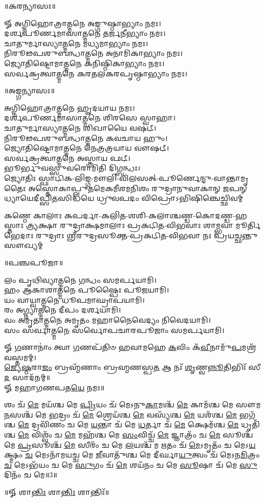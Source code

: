 \centerline{॥𑌕𑌰𑌨𑍍𑌯𑌾𑌸𑌃॥}
𑍐 𑌅𑌗𑍍𑌨𑌿𑌹𑍋𑌤𑍍𑌰𑌾𑌤𑍍𑌮𑌨𑍇 𑌅𑌙𑍍𑌗𑍁𑌷𑍍𑌠𑌾𑌭𑍍𑌯𑌾𑌂 𑌨𑌮𑌃।\\
𑌦𑌰𑍍𑌶𑌪𑍂𑌰𑍍𑌣𑌮𑌾𑌸𑌾𑌤𑍍𑌮𑌨𑍇 𑌤𑌰𑍍𑌜𑌨𑍀𑌭𑍍𑌯𑌾𑌂 𑌨𑌮𑌃।\\
𑌚𑌾𑌤𑍁𑌰𑍍𑌮𑌾𑌸𑍍𑌯𑌾𑌤𑍍𑌮𑌨𑍇 𑌮𑌧𑍍𑌯𑌮𑌾𑌭𑍍𑌯𑌾𑌂 𑌨𑌮𑌃।\\
𑌨𑌿𑌰𑍂𑌢𑌪𑌶𑍁𑌬𑌨𑍍𑌧𑌾𑌤𑍍𑌮𑌨𑍇 𑌅𑌨𑌾𑌮𑌿𑌕𑌾𑌭𑍍𑌯𑌾𑌂 𑌨𑌮𑌃।\\
𑌜𑍍𑌯𑍋𑌤𑌿𑌷𑍍𑌟𑍋𑌮𑌾𑌤𑍍𑌮𑌨𑍇 𑌕𑌨𑌿𑌷𑍍𑌠𑌿𑌕𑌾𑌭𑍍𑌯𑌾𑌂 𑌨𑌮𑌃।\\
𑌸𑌰𑍍𑌵𑌕𑍍𑌰𑌤𑍍𑌵𑌾𑌤𑍍𑌮𑌨𑍇 𑌕𑌰𑌤𑌲𑌕𑌰𑌪𑍃𑌷𑍍𑌠𑌾𑌭𑍍𑌯𑌾𑌂  𑌨𑌮𑌃।\\


\centerline{॥𑌅𑌙𑍍𑌗𑌨𑍍𑌯𑌾𑌸𑌃॥}
𑌅𑌗𑍍𑌨𑌿𑌹𑍋𑌤𑍍𑌰𑌾𑌤𑍍𑌮𑌨𑍇 𑌹𑍄𑌦𑌯𑌾𑌯 𑌨𑌮𑌃।\\
𑌦𑌰𑍍𑌶𑌪𑍂𑌰𑍍𑌣𑌮𑌾𑌸𑌾𑌤𑍍𑌮𑌨𑍇 𑌶𑌿𑌰𑌸𑍇 𑌸𑍍𑌵𑌾𑌹𑌾।\\
𑌚𑌾𑌤𑍁𑌰𑍍𑌮𑌾𑌸𑍍𑌯𑌾𑌤𑍍𑌮𑌨𑍇 𑌶𑌿𑌖𑌾𑌯𑍈 𑌵𑌷𑌟𑍍।\\
𑌨𑌿𑌰𑍂𑌢𑌪𑌶𑍁𑌬𑌨𑍍𑌧𑌾𑌤𑍍𑌮𑌨𑍇 𑌕𑌵𑌚𑌾𑌯 𑌹𑍁𑌂।\\
𑌜𑍍𑌯𑍋𑌤𑌿𑌷𑍍𑌟𑍋𑌮𑌾𑌤𑍍𑌮𑌨𑍇 𑌨𑍇𑌤𑍍𑌰𑌤𑍍𑌰𑌯𑌾𑌯 𑌵𑍗𑌷𑌟𑍍।\\
𑌸𑌰𑍍𑌵𑌕𑍍𑌰𑌤𑍍𑌵𑌾𑌤𑍍𑌮𑌨𑍇 𑌅𑌸𑍍𑌤𑍍𑌰𑌾𑌯 𑌫𑌟𑍍।\\
𑌭𑍂𑌰𑍍𑌭𑍁𑌵𑌸𑍍𑌸𑍁𑌵𑌰𑍋𑌮𑌿𑌤𑌿 𑌦𑌿𑌗𑍍𑌬𑌨𑍍𑌧𑌃।\\

\setlength{\shlokaspaceskip}{2pt}
{𑌜𑍍𑌯𑍋𑌤𑌿𑌃 𑌸𑍍𑌫𑌾𑌟𑌿𑌕-𑌲𑌿𑌙𑍍𑌗-𑌮𑍗𑌲𑌿-𑌵𑌿𑌲𑌸𑌤𑍍-𑌪𑍂𑌰𑍍𑌣𑍇𑌨𑍍𑌦𑍁-𑌵𑌾𑌨𑍍𑌤𑌾𑌮𑍃𑌤𑍈𑌃}
{𑌅𑌸𑍍𑌤𑍋𑌕𑌾𑌪𑍍𑌲𑍁𑌤𑌮𑍇𑌕𑌮𑍀𑌶𑌮𑌨𑌿𑌶𑌂 𑌰𑍁𑌦𑍍𑌰𑌾𑌨𑍁𑌵𑌾𑌕𑌾𑌨𑍍 𑌜𑌪𑌨𑍍}
{𑌧𑍍𑌯𑌾𑌯𑍇𑌦𑍀𑌪𑍍𑌸𑌿𑌤𑌸𑌿𑌦𑍍𑌧𑌯𑍇 𑌧𑍍𑌰𑍁𑌵𑌪𑌦𑌂 𑌵𑌿𑌪𑍍𑌰𑍋𑌽𑌭𑌿𑌷𑌿𑌞𑍍𑌚𑍇𑌚𑍍𑌛𑌿𑌵𑌮𑍍}

{𑌕𑌣𑍍𑌠𑍇 𑌕𑌾𑌲𑌾𑌃 𑌕𑌪𑌰𑍍𑌦𑌾-𑌕𑌲𑌿𑌤-𑌶𑌶𑌿-𑌕𑌲𑌾𑌶𑍍𑌚𑌣𑍍𑌡-𑌕𑍋𑌦𑌣𑍍𑌡-𑌹𑌸𑍍𑌤𑌾𑌃}
{𑌤𑍍𑌰𑍍𑌯𑌕𑍍𑌷𑌾 𑌰𑍁𑌦𑍍𑌰𑌾𑌕𑍍𑌷𑌮𑌾𑌲𑌾𑌃 𑌪𑍍𑌰𑌕𑌟𑌿𑌤-𑌵𑌿𑌭𑌵𑌾𑌃 𑌶𑌾𑌮𑍍𑌭𑌵𑌾 𑌮𑍂𑌰𑍍𑌤𑌿𑌭𑍇𑌦𑌾𑌃}
{𑌰𑍁𑌦𑍍𑌰𑌾𑌃 𑌶𑍍𑌰𑍀𑌰𑍁𑌦𑍍𑌰𑌸𑍂𑌕𑍍𑌤-𑌪𑍍𑌰𑌕𑌟𑌿𑌤-𑌵𑌿𑌭𑌵𑌾 𑌨𑌃 𑌪𑍍𑌰𑌯𑌚𑍍𑌛𑌨𑍍𑌤𑍁 𑌸𑍗𑌖𑍍𑌯𑌮𑍍}

\centerline{॥𑌪𑌞𑍍𑌚𑌪𑍂𑌜𑌾॥}

𑌲𑌂 𑌪𑍃𑌥𑌿𑌵𑍍𑌯𑌾𑌤𑍍𑌮𑌨𑍇 𑌗𑌨𑍍𑌧𑌂 𑌸𑌮𑌰𑍍𑌪𑌯𑌾𑌮𑌿।\\
𑌹𑌂 𑌆𑌕𑌾𑌶𑌾𑌤𑍍𑌮𑌨𑍇 𑌪𑍂𑌷𑍍𑌪𑍈𑌃 𑌪𑍂𑌜𑌯𑌾𑌮𑌿।\\
𑌯𑌂 𑌵𑌾𑌯𑍍𑌵𑌾𑌤𑍍𑌮𑌨𑍇 𑌧𑍂𑌪𑌮𑌾𑌘𑍍𑌰𑌾𑌪𑌯𑌾𑌮𑌿।\\
𑌰𑌂 𑌅𑌗𑍍𑌨𑍍𑌯𑌾𑌤𑍍𑌮𑌨𑍇 𑌦𑍀𑌪𑌂 𑌦𑌰𑍍𑌶𑌯𑌾𑌮𑌿।\\
𑌵𑌂 𑌅𑌮𑍃𑌤𑌾𑌤𑍍𑌮𑌨𑍇 𑌅𑌮𑍃𑌤𑌂 𑌮𑌹𑌾𑌨𑍈𑌵𑍇𑌦𑍍𑌯𑌂 𑌨𑌿𑌵𑍇𑌦𑌯𑌾𑌮𑌿।\\
𑌸𑌂 𑌸𑌰𑍍𑌵𑌾𑌤𑍍𑌮𑌨𑍇 𑌸𑌰𑍍𑌵𑍋𑌪𑌚𑌾𑌰𑌪𑍂𑌜𑌾𑌂 𑌸𑌮𑌰𑍍𑌪𑌯𑌾𑌮𑌿।

𑍐 \ul{𑌗}\-𑌣𑌾𑌨𑌾𑌂॑ 𑌤𑍍𑌵𑌾 \ul{𑌗}\-𑌣𑌪᳴𑌤𑌿𑍞 𑌹𑌵𑌾𑌮𑌹𑍇 \ul{𑌕}\-𑌵𑌿𑌂 𑌕᳴\-\ul{𑌵𑍀}\-𑌨𑌾𑌮𑍁᳴\-\ul{𑌪}\-\-𑌮𑌶𑍍𑌰᳴𑌵𑌸𑍍𑌤𑌮𑌮𑍍। \\
\-\ul{𑌜𑍍𑌯𑍇}\-\-\ul{𑌷𑍍𑌠}\-𑌰𑌾\-\ul{𑌜𑌂} 𑌬𑍍𑌰𑌹𑍍𑌮᳴𑌣𑌾𑌂 𑌬𑍍𑌰𑌹𑍍𑌮𑌣𑌸𑍍𑌪\-\ul{𑌤} 𑌆 𑌨𑌃᳴ \ul{𑌶𑍃}\-𑌣𑍍𑌵\-\ul{𑌨𑍍𑌨𑍂}\-𑌤𑌿𑌭𑌿𑌃᳴ 𑌸𑍀\-\ul{𑌦} 𑌸𑌾𑌦᳴𑌨𑌮𑍍॥ \\
𑍐 𑌮𑌹𑌾𑌗𑌣𑌪𑌤\-\ul{𑌯𑍇} 𑌨𑌮𑌃॥ 


𑌶𑌂 𑌚᳴ \ul{𑌮𑍇} 𑌮𑌯᳴𑌶𑍍𑌚 𑌮𑍇 \ul{𑌪𑍍𑌰𑌿}\-𑌯𑌂 𑌚᳴ 𑌮𑍇𑌽𑌨𑍁\-\ul{𑌕𑌾}\-𑌮𑌶𑍍𑌚᳴ \ul{𑌮𑍇} 𑌕𑌾𑌮᳴𑌶𑍍𑌚 𑌮𑍇 𑌸𑍗𑌮\-\ul{𑌨}\-𑌸𑌶𑍍𑌚᳴ 𑌮𑍇 \ul{𑌭}\-𑌦𑍍𑌰𑌂 𑌚᳴ \ul{𑌮𑍇} 𑌶𑍍𑌰𑍇𑌯᳴𑌶𑍍𑌚 \ul{𑌮𑍇} 𑌵𑌸𑍍𑌯᳴𑌶𑍍𑌚 \ul{𑌮𑍇} 𑌯𑌶᳴𑌶𑍍𑌚 \ul{𑌮𑍇} 𑌭𑌗᳴𑌶𑍍𑌚 \ul{𑌮𑍇} 𑌦𑍍𑌰𑌵𑌿᳴𑌣𑌂 𑌚 𑌮𑍇 \ul{𑌯}\-𑌨𑍍𑌤𑌾 𑌚᳴ 𑌮𑍇 \ul{𑌧}\-𑌰𑍍𑌤𑌾 𑌚᳴ \ul{𑌮𑍇} 𑌕𑍍𑌷𑍇𑌮᳴𑌶𑍍𑌚 \ul{𑌮𑍇} 𑌧𑍃𑌤𑌿᳴𑌶𑍍𑌚 \ul{𑌮𑍇} 𑌵𑌿𑌶𑍍𑌵𑌂᳴ 𑌚 \ul{𑌮𑍇} 𑌮𑌹᳴𑌶𑍍𑌚 𑌮𑍇 \ul{𑌸𑌂}\-𑌵𑌿𑌚𑍍𑌚᳴ \ul{𑌮𑍇} 𑌜𑍍𑌞𑌾𑌤𑍍𑌰𑌂᳴ 𑌚 \ul{𑌮𑍇} 𑌸𑍂𑌶𑍍𑌚᳴ 𑌮𑍇 \ul{𑌪𑍍𑌰}\-𑌸𑍂𑌶𑍍𑌚᳴ \ul{𑌮𑍇} 𑌸𑍀𑌰𑌂᳴ 𑌚 𑌮𑍇 \ul{𑌲}\-𑌯𑌶𑍍𑌚᳴ 𑌮 \ul{𑌋}\-𑌤𑌂 𑌚᳴ \ul{𑌮𑍇}\-𑌽𑌮𑍃𑌤𑌂᳴ 𑌚 𑌮𑍇𑌽\-\ul{𑌯}\-𑌕𑍍𑌷𑍍𑌮𑌂 \ul{𑌚} 𑌮𑍇𑌽𑌨𑌾᳴𑌮𑌯𑌚𑍍𑌚 𑌮𑍇 \ul{𑌜𑍀}\-𑌵𑌾𑌤𑍁᳴𑌶𑍍𑌚 𑌮𑍇 𑌦𑍀𑌰𑍍𑌘𑌾\-\ul{𑌯𑍁}\-𑌤𑍍𑌵𑌂 𑌚᳴ 𑌮𑍇𑌽𑌨\-\ul{𑌮𑌿}\-𑌤𑍍𑌰𑌂 \ul{𑌚} 𑌮𑍇𑌽𑌭᳴𑌯𑌂 𑌚 𑌮𑍇 \ul{𑌸𑍁}\-𑌗𑌂 𑌚᳴ \ul{𑌮𑍇} 𑌶𑌯᳴𑌨𑌂 𑌚 𑌮𑍇 \ul{𑌸𑍂}\-𑌷𑌾 𑌚᳴ 𑌮𑍇 \ul{𑌸𑍁}\-𑌦𑌿𑌨𑌂᳴ 𑌚 𑌮𑍇॥3॥ 
\centerline{॥𑍐 𑌶𑌾\-\ul{𑌨𑍍𑌤𑌿𑌃} 𑌶𑌾\-\ul{𑌨𑍍𑌤𑌿𑌃} 𑌶𑌾𑌨𑍍𑌤𑌿𑌃᳴॥}
{\closesection}
